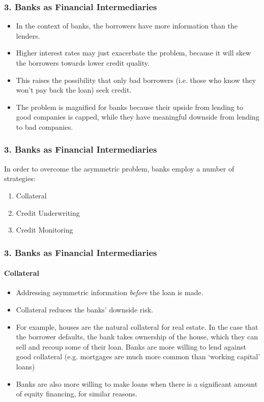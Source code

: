 \documentclass{beamer}
\begin{document}
\begin{frame}[t]
    \frametitle{3. Banks as Financial Intermediaries}

    \begin{itemize}
        \item In the context of banks, the borrowers have more information than the lenders.
        \item Higher interest rates may just exacerbate the problem, because it will skew the borrowers towards lower credit quality.
        \item This raises the possibility that only bad borrowers (i.e. those who know they won’t pay back the loan) seek credit.
        \item The problem is magnified for banks because their upside from lending to good companies is capped, while they have meaningful downside from lending to bad companies.
    \end{itemize}


\end{frame}

\begin{frame}[t]
    \frametitle{3. Banks as Financial Intermediaries}

    In order to overcome the asymmetric problem, banks employ a number of strategies:

    \begin{enumerate}
        \item Collateral
        \item Credit Underwriting
        \item Credit Monitoring
    \end{enumerate}
    
\end{frame}

\begin{frame}[t]
    \frametitle{3. Banks as Financial Intermediaries}
    \framesubtitle{Collateral}

    \begin{itemize}
        \item Addressing asymmetric information \textit{before} the loan is made.
        \item Collateral reduces the banks’ downside risk.
        \item For example, houses are the natural collateral for real estate.  In the case that the borrower defaults, the bank takes ownership of the house, which they can sell and recoup some of their loan.  Banks are more willing to lend against good collateral (e.g. mortgages are much more common than ‘working capital’ loans)
        \item Banks are also more willing to make loans when there is a significant amount of equity financing, for similar reasons.
    \end{itemize}

\end{frame}
\end{document}
